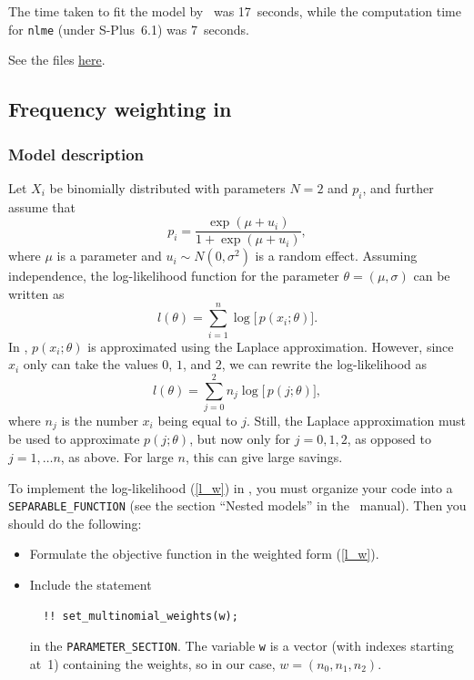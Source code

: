\documentclass{admbmanual}
\begin{document}
The time taken to fit the model by \scAR\ was 17~seconds, while the computation
time for \texttt{nlme} (under S-Plus~6.1) was 7~seconds.

See the files
\href{http://otter-rsch.com/admbre/examples/pheno/pheno.html}{here}.

\subsection{Frequency weighting in \scAR}
\label{seq:frequency_example}

\subsubsection{Model description}

Let $X_i$ be binomially distributed with parameters $N=2$ and $p_i$, and
further assume that
\begin{equation}
  p_i=\frac{\exp (\mu +u_i)}{1+\exp (\mu +u_i)},
\end{equation}%
where $\mu $ is a parameter and $u_i\sim N(0,\sigma^2)$ is a random effect.
Assuming independence, the log-likelihood function for the parameter $\theta
=(\mu,\sigma)$ can be written as
\begin{equation}
  l(\theta)=\sum_{i=1}^n\log \bigl[\, p(x_i;\theta)\bigr] .
\end{equation}%
In \scAR, $p(x_i;\theta)$ is approximated using the Laplace approximation.
However, since $x_i$ only can take the values $0$, $1$, and $2$, we can
rewrite the log-likelihood as
\begin{equation}
  l(\theta)=\sum_{j=0}^2n_j\log \bigl[\, p(j;\theta)\bigr],  \label{l_w}
\end{equation}%
where $n_j$ is the number $x_i$ being equal to $j$. Still, the Laplace
approximation must be used to approximate $p(j;\theta)$, but now only for
$j=0,1,2$, as opposed to $j = 1,\dots n$, as above. For large $n$, this can give
large savings.

To implement the log-likelihood (\ref{l_w}) in \scAR, you must organize your
code into a \texttt{SEPARABLE\_FUNCTION} (see the section ``Nested models'' in
the \scAR\ manual). Then you should do the following:
\begin{itemize}
  \item Formulate the objective function in the weighted form (\ref{l_w}).

  \item Include the statement
  \begin{lstlisting}
  !! set_multinomial_weights(w);
  \end{lstlisting}
  in the \texttt{PARAMETER\_SECTION}. The variable \texttt{w} is a vector (with
  indexes starting at~1) containing the weights, so in our case,
  $w=(n_0,n_1,n_2)$.
\end{itemize}
\end{document}
